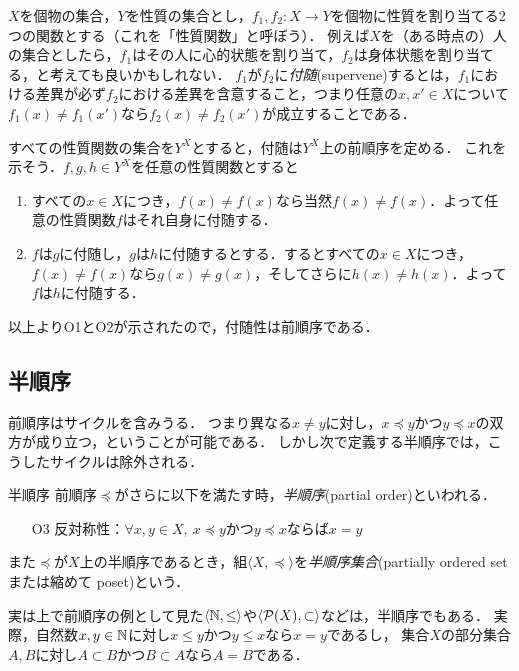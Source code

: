 \documentclass[dvipdfmx,11pt,a4paper]{jsarticle}
\begin{document}
\begin{example}[Supervenience] \label{supervenience}
 $X$を個物の集合，$Y$を性質の集合とし，$f_1, f_2:X \to Y$を個物に性質を割り当てる2つの関数とする（これを「性質関数」と呼ぼう）．
 例えば$X$を（ある時点の）人の集合としたら，$f_1$はその人に心的状態を割り当て，$f_2$は身体状態を割り当てる，と考えても良いかもしれない．
 $f_1$が$f_2$に\emph{付随}(supervene)するとは，$f_1$における差異が必ず$f_2$における差異を含意すること，つまり任意の$x, x' \in X$について$f_1(x) \neq f_1(x')$なら$f_2(x) \neq f_2(x')$が成立することである．

 すべての性質関数の集合を$Y^X$とすると，付随は$Y^X$上の前順序を定める．
 これを示そう．$f, g, h \in Y^X$を任意の性質関数とすると
 \begin{enumerate}
  \item すべての$x \in X$につき，$f(x) \neq f(x)$なら当然$f(x) \neq f(x)$．よって任意の性質関数$f$はそれ自身に付随する．
  \item $f$は$g$に付随し，$g$は$h$に付随するとする．するとすべての$x \in X$につき，$f(x) \neq f(x)$なら$g(x) \neq g(x)$，そしてさらに$h(x) \neq h(x)$．よって$f$は$h$に付随する．
 \end{enumerate}
以上よりO1とO2が示されたので，付随性は前順序である．
\end{example}
   
\subsection{半順序}
前順序はサイクルを含みうる．
つまり異なる$x \neq y$に対し，$x \preceq y$かつ$y \preceq x$の双方が成り立つ，ということが可能である．
しかし次で定義する半順序では，こうしたサイクルは除外される．

\begin{itembox}[l]{半順序}
前順序$\preceq$がさらに以下を満たす時，\emph{半順序}(partial order)といわれる．
\begin{itemize}
 \item[O3] 反対称性：$\forall x, y \in X, \ x \preceq y$かつ$y \preceq x$ならば$x = y$
\end{itemize}
また$\preceq$が$X$上の半順序であるとき，組$\langle X, \preceq \rangle$を\emph{半順序集合}(partially ordered set または縮めて poset)という．
\end{itembox}

実は上で前順序の例として見た$\langle \mathbb{N}, \leq \rangle$や$\langle \mathcal{P}(X), \subset \rangle$などは，半順序でもある．
実際，自然数$x, y \in \mathbb{N}$に対し$x \leq y$かつ$y \leq x$なら$x=y$であるし，
集合$X$の部分集合$A, B$に対し$A \subset B$かつ$B \subset A$なら$A=B$である．
\end{document}
